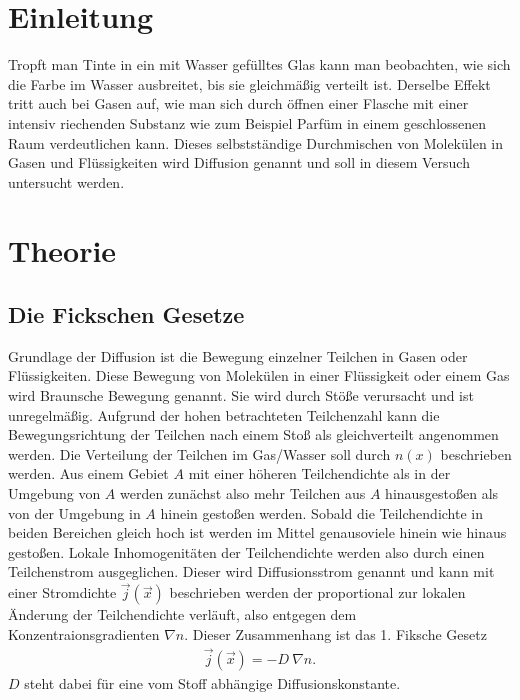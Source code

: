 \documentclass[12pt, a4paper, twoside]{scrartcl}
\begin{document}

\cleardoublepage
\tableofcontents
\cleardoublepage
\setcounter{page}{1}

\section{Einleitung}
\label{sec:einleitung}

Tropft man Tinte in ein mit Wasser gefülltes Glas kann man beobachten, wie sich die Farbe im Wasser ausbreitet, bis sie gleichmäßig verteilt ist. Derselbe Effekt tritt auch bei Gasen auf, wie man sich durch öffnen einer Flasche mit einer intensiv riechenden Substanz wie zum Beispiel Parfüm in einem geschlossenen Raum verdeutlichen kann. Dieses selbstständige Durchmischen von Molekülen in Gasen und Flüssigkeiten wird Diffusion genannt und soll in diesem Versuch untersucht werden.

\section{Theorie}
\label{sec:theorie}

\subsection{Die Fickschen Gesetze}

Grundlage der Diffusion ist die Bewegung einzelner Teilchen in Gasen oder Flüssigkeiten. Diese Bewegung von Molekülen in einer Flüssigkeit oder einem Gas wird Braunsche Bewegung genannt. Sie wird durch Stöße verursacht und ist unregelmäßig. Aufgrund der hohen betrachteten Teilchenzahl kann die Bewegungsrichtung der Teilchen nach einem Stoß als gleichverteilt angenommen werden. Die Verteilung der Teilchen im Gas/Wasser soll durch $n(x)$ beschrieben werden. Aus einem Gebiet $A$ mit einer höheren Teilchendichte als in der Umgebung von $A$ werden zunächst also mehr Teilchen aus $A$ hinausgestoßen als von der Umgebung in $A$ hinein gestoßen werden. Sobald die Teilchendichte in beiden Bereichen gleich hoch ist werden im Mittel genausoviele hinein wie hinaus gestoßen. Lokale Inhomogenitäten der Teilchendichte werden also durch einen Teilchenstrom ausgeglichen. Dieser wird Diffusionsstrom genannt und kann mit einer Stromdichte $\vec{j}(\vec{x})$ beschrieben werden der proportional zur lokalen Änderung der Teilchendichte verläuft, also entgegen dem Konzentraionsgradienten $\nabla n$. Dieser Zusammenhang ist das 1. Fiksche Gesetz
\begin{align}
\vec{j}(\vec{x})=-D\ \nabla n.
\end{align}
$D$ steht dabei für eine vom Stoff abhängige Diffusionskonstante. \\
\end{document}
